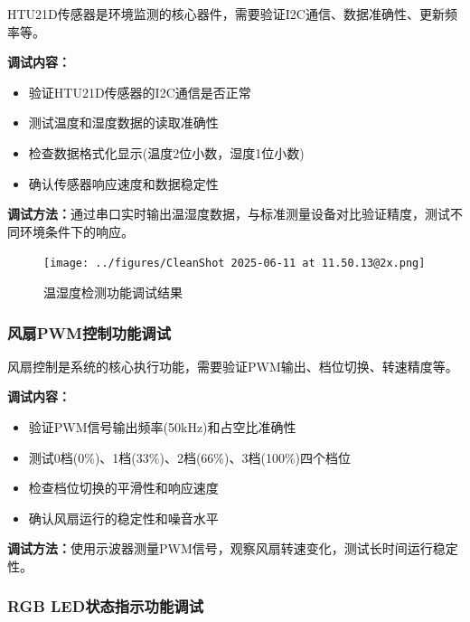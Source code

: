 \qquad HTU21D传感器是环境监测的核心器件，需要验证I2C通信、数据准确性、更新频率等。

\textbf{调试内容：}
\begin{itemize}
    \vspace{-6pt}
  \item 验证HTU21D传感器的I2C通信是否正常
    \vspace{-6pt}
  \item 测试温度和湿度数据的读取准确性
    \vspace{-6pt}
  \item 检查数据格式化显示(温度2位小数，湿度1位小数)
    \vspace{-6pt}
  \item 确认传感器响应速度和数据稳定性
\end{itemize}

\textbf{调试方法：}通过串口实时输出温湿度数据，与标准测量设备对比验证精度，测试不同环境条件下的响应。

\begin{figure}[H]
  \centering
  \texttt{[image: ../figures/CleanShot 2025-06-11 at 11.50.13@2x.png]}
  \caption{温湿度检测功能调试结果}
  \label{fig:htu21d_debug}
\end{figure}

\subsubsection{风扇PWM控制功能调试}

\qquad 风扇控制是系统的核心执行功能，需要验证PWM输出、档位切换、转速精度等。

\textbf{调试内容：}
\begin{itemize}
    \vspace{-6pt}
  \item 验证PWM信号输出频率(50kHz)和占空比准确性
    \vspace{-6pt}
  \item 测试0档(0\%)、1档(33\%)、2档(66\%)、3档(100\%)四个档位
    \vspace{-6pt}
  \item 检查档位切换的平滑性和响应速度
    \vspace{-6pt}
  \item 确认风扇运行的稳定性和噪音水平
\end{itemize}

\textbf{调试方法：}使用示波器测量PWM信号，观察风扇转速变化，测试长时间运行稳定性。

\subsubsection{RGB LED状态指示功能调试}

